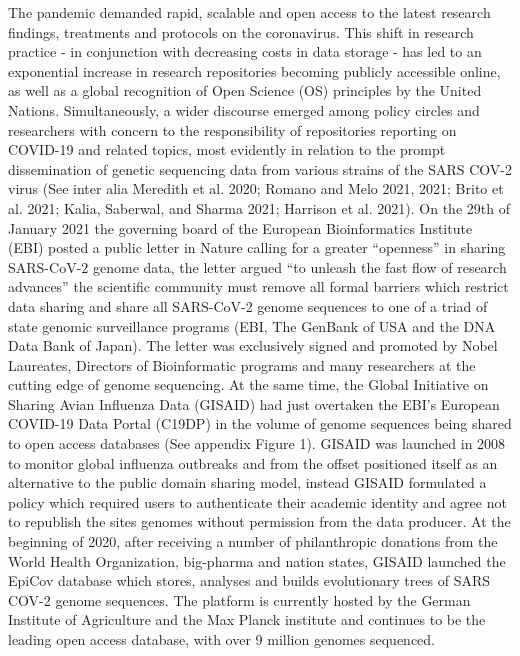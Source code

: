 \documentclass{article}
\begin{document}
The pandemic demanded rapid, scalable and open access to the latest
research findings, treatments and protocols on the coronavirus. This
shift in research practice - in conjunction with decreasing costs in
data storage - has led to an exponential increase in research
repositories becoming publicly accessible online, as well as a global
recognition of Open Science (OS) principles by the United Nations.
Simultaneously, a wider discourse emerged among policy circles and
researchers with concern to the responsibility of repositories reporting
on COVID-19 and related topics, most evidently in relation to the prompt
dissemination of genetic sequencing data from various strains of the
SARS COV-2 virus (See inter alia Meredith et al. 2020; Romano and Melo
2021, 2021; Brito et al. 2021; Kalia, Saberwal, and Sharma 2021;
Harrison et al. 2021). On the 29th of January 2021 the governing board
of the European Bioinformatics Institute (EBI) posted a public letter in
Nature calling for a greater ``openness'' in sharing SARS-CoV-2 genome
data, the letter argued ``to unleash the fast flow of research
advances'' the scientific community must remove all formal barriers
which restrict data sharing and share all SARS-CoV-2 genome sequences to
one of a triad of state genomic surveillance programs (EBI, The GenBank
of USA and the DNA Data Bank of Japan). The letter was exclusively
signed and promoted by Nobel Laureates, Directors of Bioinformatic
programs and many researchers at the cutting edge of genome sequencing.
At the same time, the Global Initiative on Sharing Avian Influenza Data
(GISAID) had just overtaken the EBI's European COVID-19 Data Portal
(C19DP) in the volume of genome sequences being shared to open access
databases (See appendix Figure 1). GISAID was launched in 2008 to
monitor global influenza outbreaks and from the offset positioned itself
as an alternative to the public domain sharing model, instead GISAID
formulated a policy which required users to authenticate their academic
identity and agree not to republish the sites genomes without permission
from the data producer. At the beginning of 2020, after receiving a
number of philanthropic donations from the World Health Organization,
big-pharma and nation states, GISAID launched the EpiCov database which
stores, analyses and builds evolutionary trees of SARS COV-2 genome
sequences. The platform is currently hosted by the German Institute of
Agriculture and the Max Planck institute and continues to be the leading
open access database, with over 9 million genomes sequenced.
\end{document}
